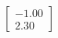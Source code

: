 \documentclass[preview]{standalone}
\begin{document}
\begin{align*}
\begin{bmatrix} -1.00 \\ 2.30 \end{bmatrix}
\end{align*}
\end{document}
